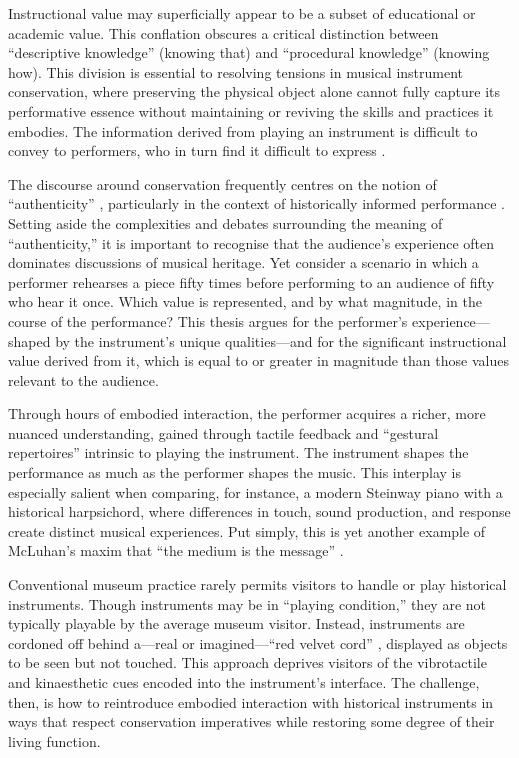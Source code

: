 Instructional value may superficially appear to be a subset of educational or
academic value. This conflation obscures a critical distinction between
``descriptive knowledge'' (knowing that) and ``procedural knowledge'' (knowing
how). This division is essential to resolving tensions in musical instrument
conservation, where preserving the physical object alone cannot fully capture
its performative essence without maintaining or reviving the skills and
practices it embodies. The information derived from playing an instrument is
difficult to convey to performers, who in turn find it difficult to express
\cite{lamb_play_2007}.

The discourse around conservation frequently centres on the notion of
``authenticity'' \cite{pine_museums_2007, laurenson_authenticity_2006},
particularly in the context of historically informed performance
\cite{davies_authenticity_2001}. Setting aside the complexities and debates
surrounding the meaning of ``authenticity,'' it is important to recognise that
the audience's experience often dominates discussions of musical heritage. Yet
consider a scenario in which a performer rehearses a piece fifty times before
performing to an audience of fifty who hear it once. Which value is represented,
and by what magnitude, in the course of the performance? This thesis argues for
the performer’s experience---shaped by the instrument’s unique qualities---and for
the significant instructional value derived from it, which is equal to or
greater in magnitude than those values relevant to the audience.

Through hours of embodied interaction, the performer acquires a richer, more
nuanced understanding, gained through tactile feedback and ``gestural
repertoires'' \cite{levinson_music_1990} intrinsic to playing the instrument.
The instrument shapes the performance as much as the performer shapes the music.
This interplay is especially salient when comparing, for instance, a modern
Steinway piano with a historical harpsichord, where differences in touch, sound
production, and response create distinct musical experiences. Put simply, this
is yet another example of McLuhan’s maxim that ``the medium is the message''
\cite{mcluhan_understanding_1964}.

Conventional museum practice rarely permits visitors to handle or play
historical instruments. Though instruments may be in ``playing condition,'' they
are not typically playable by the average museum visitor. Instead, instruments
are cordoned off behind a---real or imagined---``red velvet cord''
\cite{mcalpine_sampling_2014}, displayed as objects to be seen but not touched.
This approach deprives visitors of the vibrotactile and kinaesthetic cues
encoded into the instrument’s interface. The challenge, then, is how to
reintroduce embodied interaction with historical instruments in ways that
respect conservation imperatives while restoring some degree of their living
function.

